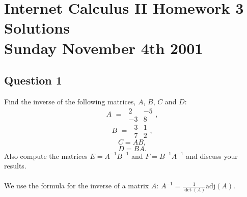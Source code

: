 \documentclass[12pt]{article}
\newcommand{\adj}{\textrm{adj}}
\begin{document}
\noindent \section*{Internet Calculus II
\hspace{5pt} Homework 3 Solutions\\Sunday November 4th 2001}
\subsection*{Question 1}
Find the inverse of the following matrices, $A$, $B$, $C$ and $D$:
\[ A\hspace{4pt} = \hspace{4pt} \begin{array}{|cc|}2&-5\\-3&8\end{array},\]
\[ B\hspace{4pt} = \hspace{4pt}\begin{array}{|cc|}3&1\\7&2\end{array},\]
\[ C = AB, \]
\[ D = BA.\]
Also compute the matrices $E = A^{-1}B^{-1}$ and $F = B^{-1}A^{-1}$ and discuss your results.\\
\\
We use the formula for the inverse of a matrix $A$: 
$A^{-1} = \frac{1}{\det(A)}\adj(A)$.
\end{document}
